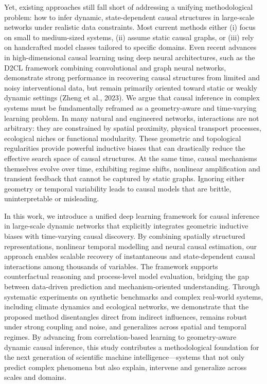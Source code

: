 \documentclass{article}
\begin{document}
Yet, existing approaches still fall short of addressing a unifying methodological problem: how to infer dynamic, state-dependent causal structures in large-scale networks under realistic data constraints. Most current methods either (i) focus on small to medium-sized systems, (ii) assume static causal graphs, or (iii) rely on handcrafted model classes tailored to specific domains. Even recent advances in high-dimensional causal learning using deep neural architectures, such as the D2CL framework combining convolutional and graph neural networks, demonstrate strong performance in recovering causal structures from limited and noisy interventional data, but remain primarily oriented toward static or weakly dynamic settings (Zheng et al., 2023). We argue that causal inference in complex systems must be fundamentally reframed as a geometry-aware and time-varying learning problem. In many natural and engineered networks, interactions are not arbitrary: they are constrained by spatial proximity, physical transport processes, ecological niches or functional modularity. These geometric and topological regularities provide powerful inductive biases that can drastically reduce the effective search space of causal structures. At the same time, causal mechanisms themselves evolve over time, exhibiting regime shifts, nonlinear amplification and transient feedback that cannot be captured by static graphs. Ignoring either geometry or temporal variability leads to causal models that are brittle, uninterpretable or misleading.

In this work, we introduce a unified deep learning framework for causal inference in large-scale dynamic networks that explicitly integrates geometric inductive biases with time-varying causal discovery. By combining spatially structured representations, nonlinear temporal modelling and neural causal estimation, our approach enables scalable recovery of instantaneous and state-dependent causal interactions among thousands of variables. The framework supports counterfactual reasoning and process-level model evaluation, bridging the gap between data-driven prediction and mechanism-oriented understanding. Through systematic experiments on synthetic benchmarks and complex real-world systems, including climate dynamics and ecological networks, we demonstrate that the proposed method disentangles direct from indirect influences, remains robust under strong coupling and noise, and generalizes across spatial and temporal regimes. By advancing from correlation-based learning to geometry-aware dynamic causal inference, this study contributes a methodological foundation for the next generation of scientific machine intelligence—systems that not only predict complex phenomena but also explain, intervene and generalize across scales and domains.
\end{document}
